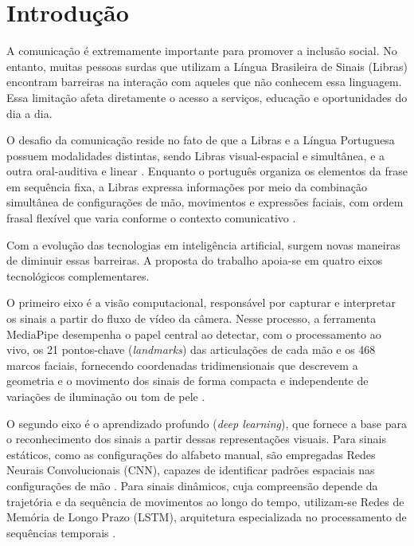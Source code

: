 \documentclass[
    12pt,                %
    openright,           %
    oneside,             %
    a4paper,             %
    english,             %
    brazil               %
]{abntex2}
\begin{document}
\tableofcontents*
\cleardoublepage


\textual

\chapter{Introdução}
\label{cap:introducao}
A comunicação é extremamente importante para promover a inclusão social. No entanto, muitas pessoas surdas que utilizam a Língua Brasileira de Sinais (Libras) encontram barreiras na interação com aqueles que não conhecem essa linguagem. Essa limitação afeta diretamente o acesso a serviços, educação e oportunidades do dia a dia.

O desafio da comunicação reside no fato de que a Libras e a Língua Portuguesa possuem modalidades distintas, sendo Libras visual-espacial e simultânea, e a outra oral-auditiva e linear \cite{Olizaroski2024}. Enquanto o português organiza os elementos da frase em sequência fixa, a Libras expressa informações por meio da combinação simultânea de configurações de mão, movimentos e expressões faciais, com ordem frasal flexível que varia conforme o contexto comunicativo \cite{Quadros2004}.

Com a evolução das tecnologias em inteligência artificial, surgem novas maneiras de diminuir essas barreiras. A proposta do trabalho apoia-se em quatro eixos tecnológicos complementares.

O primeiro eixo é a visão computacional, responsável por capturar e interpretar os sinais a partir do fluxo de vídeo da câmera. Nesse processo, a ferramenta MediaPipe \cite{Lugaresi2019} desempenha o papel central ao detectar, com o processamento ao vivo, os 21 pontos-chave (\textit{landmarks}) das articulações de cada mão e os 468 marcos faciais, fornecendo coordenadas tridimensionais que descrevem a geometria e o movimento dos sinais de forma compacta e independente de variações de iluminação ou tom de pele \cite{Zhang2020}.

O segundo eixo é o aprendizado profundo (\textit{deep learning}), que fornece a base para o reconhecimento dos sinais a partir dessas representações visuais. Para sinais estáticos, como as configurações do alfabeto manual, são empregadas Redes Neurais Convolucionais (CNN), capazes de identificar padrões espaciais nas configurações de mão \cite{Lecun1998}. Para sinais dinâmicos, cuja compreensão depende da trajetória e da sequência de movimentos ao longo do tempo, utilizam-se Redes de Memória de Longo Prazo (LSTM), arquitetura especializada no processamento de sequências temporais \cite{Hochreiter1997}.
\end{document}
